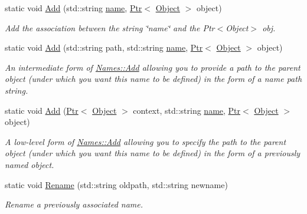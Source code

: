 \begin{DoxyCompactItemize}
\item 
static void \hyperlink{classns3_1_1Names_a5075ee36f97059d897cf6430ce61e592}{Add} (std\+::string \hyperlink{generate__test__data__lte__spectrum__model_8m_ab74e6bf80237ddc4109968cedc58c151}{name}, \hyperlink{classns3_1_1Ptr}{Ptr}$<$ \hyperlink{classns3_1_1Object}{Object} $>$ object)
\begin{DoxyCompactList}\small\item\em Add the association between the string \char`\"{}name\char`\"{} and the Ptr$<$\+Object$>$ obj. \end{DoxyCompactList}\item 
static void \hyperlink{classns3_1_1Names_a1a251b61a3a52abf2c138c7bddcc0024}{Add} (std\+::string path, std\+::string \hyperlink{generate__test__data__lte__spectrum__model_8m_ab74e6bf80237ddc4109968cedc58c151}{name}, \hyperlink{classns3_1_1Ptr}{Ptr}$<$ \hyperlink{classns3_1_1Object}{Object} $>$ object)
\begin{DoxyCompactList}\small\item\em An intermediate form of \hyperlink{classns3_1_1Names_a5075ee36f97059d897cf6430ce61e592}{Names\+::\+Add} allowing you to provide a path to the parent object (under which you want this name to be defined) in the form of a name path string. \end{DoxyCompactList}\item 
static void \hyperlink{classns3_1_1Names_a93e958166cb8296bc0fa035668d83040}{Add} (\hyperlink{classns3_1_1Ptr}{Ptr}$<$ \hyperlink{classns3_1_1Object}{Object} $>$ context, std\+::string \hyperlink{generate__test__data__lte__spectrum__model_8m_ab74e6bf80237ddc4109968cedc58c151}{name}, \hyperlink{classns3_1_1Ptr}{Ptr}$<$ \hyperlink{classns3_1_1Object}{Object} $>$ object)
\begin{DoxyCompactList}\small\item\em A low-\/level form of \hyperlink{classns3_1_1Names_a5075ee36f97059d897cf6430ce61e592}{Names\+::\+Add} allowing you to specify the path to the parent object (under which you want this name to be defined) in the form of a previously named object. \end{DoxyCompactList}\item 
static void \hyperlink{classns3_1_1Names_a0ed4aa6358357bef3930cd19ba306373}{Rename} (std\+::string oldpath, std\+::string newname)
\begin{DoxyCompactList}\small\item\em Rename a previously associated name. \end{DoxyCompactList}\item 

\end{DoxyCompactItemize}
